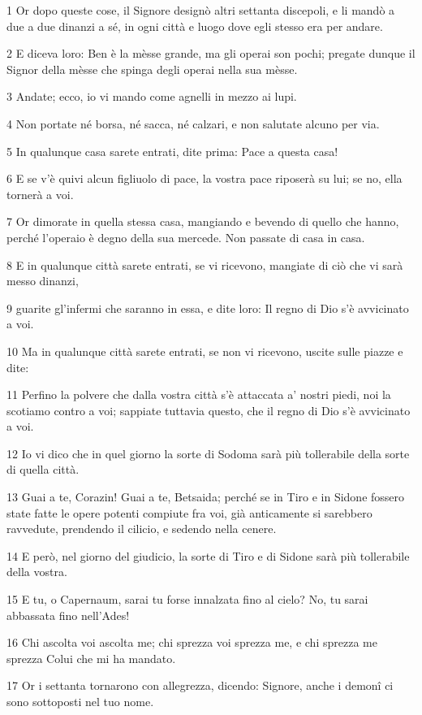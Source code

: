 \par 1 Or dopo queste cose, il Signore designò altri settanta discepoli, e li mandò a due a due dinanzi a sé, in ogni città e luogo dove egli stesso era per andare.
\par 2 E diceva loro: Ben è la mèsse grande, ma gli operai son pochi; pregate dunque il Signor della mèsse che spinga degli operai nella sua mèsse.
\par 3 Andate; ecco, io vi mando come agnelli in mezzo ai lupi.
\par 4 Non portate né borsa, né sacca, né calzari, e non salutate alcuno per via.
\par 5 In qualunque casa sarete entrati, dite prima: Pace a questa casa!
\par 6 E se v'è quivi alcun figliuolo di pace, la vostra pace riposerà su lui; se no, ella tornerà a voi.
\par 7 Or dimorate in quella stessa casa, mangiando e bevendo di quello che hanno, perché l'operaio è degno della sua mercede. Non passate di casa in casa.
\par 8 E in qualunque città sarete entrati, se vi ricevono, mangiate di ciò che vi sarà messo dinanzi,
\par 9 guarite gl'infermi che saranno in essa, e dite loro: Il regno di Dio s'è avvicinato a voi.
\par 10 Ma in qualunque città sarete entrati, se non vi ricevono, uscite sulle piazze e dite:
\par 11 Perfino la polvere che dalla vostra città s'è attaccata a' nostri piedi, noi la scotiamo contro a voi; sappiate tuttavia questo, che il regno di Dio s'è avvicinato a voi.
\par 12 Io vi dico che in quel giorno la sorte di Sodoma sarà più tollerabile della sorte di quella città.
\par 13 Guai a te, Corazin! Guai a te, Betsaida; perché se in Tiro e in Sidone fossero state fatte le opere potenti compiute fra voi, già anticamente si sarebbero ravvedute, prendendo il cilicio, e sedendo nella cenere.
\par 14 E però, nel giorno del giudicio, la sorte di Tiro e di Sidone sarà più tollerabile della vostra.
\par 15 E tu, o Capernaum, sarai tu forse innalzata fino al cielo? No, tu sarai abbassata fino nell'Ades!
\par 16 Chi ascolta voi ascolta me; chi sprezza voi sprezza me, e chi sprezza me sprezza Colui che mi ha mandato.
\par 17 Or i settanta tornarono con allegrezza, dicendo: Signore, anche i demonî ci sono sottoposti nel tuo nome.
